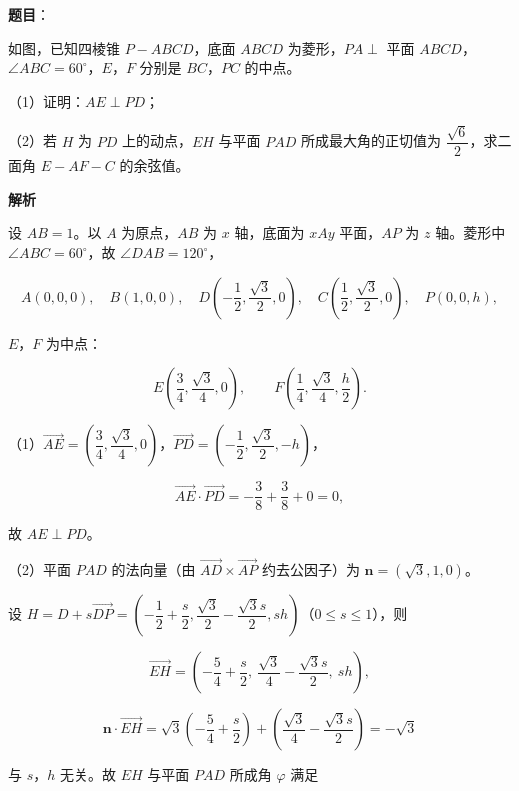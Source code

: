 \begin{answer}

\textbf{题目}：

如图，已知四棱锥 $P-ABCD$，底面 $ABCD$ 为菱形，$PA\perp$ 平面 $ABCD$，$\angle ABC=60^\circ$，$E$，$F$ 分别是 $BC$，$PC$ 的中点。

（1）证明：$AE\perp PD$；

（2）若 $H$ 为 $PD$ 上的动点，$EH$ 与平面 $PAD$ 所成最大角的正切值为 $\dfrac{\sqrt6}2$，求二面角 $E-AF-C$ 的余弦值。
\nopagebreak[4]
\begin{center}\end{center}
\nopagebreak[4]
\textbf{解析}

设 $AB=1$。以 $A$ 为原点，$AB$ 为 $x$ 轴，底面为 $xAy$ 平面，$AP$ 为 $z$ 轴。菱形中 $\angle ABC=60^\circ$，故 $\angle DAB=120^\circ$，

\nopagebreak[4]
\[A(0,0,0),\quad B(1,0,0),\quad D\left(-\frac12,\frac{\sqrt3}2,0\right),\quad C\left(\frac12,\frac{\sqrt3}2,0\right),\quad P(0,0,h),\]

$E$，$F$ 为中点：

\nopagebreak[4]
\[E\left(\frac34,\frac{\sqrt3}4,0\right),\qquad F\left(\frac14,\frac{\sqrt3}4,\frac h2\right).\]

（1）$\overrightarrow{AE}=\left(\dfrac34,\dfrac{\sqrt3}4,0\right)$，$\overrightarrow{PD}=\left(-\dfrac12,\dfrac{\sqrt3}2,-h\right)$，

\nopagebreak[4]
\[\overrightarrow{AE}\cdot\overrightarrow{PD}=-\frac38+\frac38+0=0,\]

故 $AE\perp PD$。

（2）平面 $PAD$ 的法向量（由 $\overrightarrow{AD}\times\overrightarrow{AP}$ 约去公因子）为 $\boldsymbol n=(\sqrt3,1,0)$。

设 $H=D+s\overrightarrow{DP}=\left(-\dfrac12+\dfrac s2,\dfrac{\sqrt3}2-\dfrac{\sqrt3s}2,sh\right)$（$0\leqslant s\leqslant1$），则

\nopagebreak[4]
\[\overrightarrow{EH}=\left(-\frac54+\frac s2,\ \frac{\sqrt3}4-\frac{\sqrt3s}2,\ sh\right),\]

\nopagebreak[4]
\[\boldsymbol n\cdot\overrightarrow{EH}=\sqrt3\left(-\frac54+\frac s2\right)+\left(\frac{\sqrt3}4-\frac{\sqrt3s}2\right)=-\sqrt3\]

与 $s$，$h$ 无关。故 $EH$ 与平面 $PAD$ 所成角 $\varphi$ 满足


\end{answer}
